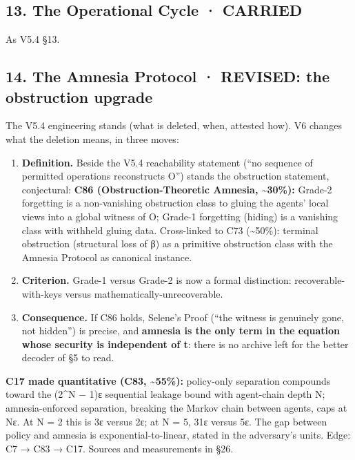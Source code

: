 \documentclass[
]{article}
\providecommand{\tightlist}{%
  \setlength{\itemsep}{0pt}\setlength{\parskip}{0pt}}
\begin{document}
\subsection{13. The Operational Cycle ·
CARRIED}\label{the-operational-cycle-carried}

As V5.4 §13.

\subsection{14. The Amnesia Protocol · REVISED: the obstruction
upgrade}\label{the-amnesia-protocol-revised-the-obstruction-upgrade}

The V5.4 engineering stands (what is deleted, when, attested how). V6
changes what the deletion means, in three moves:

\begin{enumerate}
\def\labelenumi{\arabic{enumi}.}
\tightlist
\item
  \textbf{Definition.} Beside the V5.4 reachability statement (``no
  sequence of permitted operations reconstructs O'') stands the
  obstruction statement, conjectural: \textbf{C86 (Obstruction-Theoretic
  Amnesia, \textasciitilde30\%):} Grade-2 forgetting is a non-vanishing
  obstruction class to gluing the agents' local views into a global
  witness of O; Grade-1 forgetting (hiding) is a vanishing class with
  withheld gluing data. Cross-linked to C73 (\textasciitilde50\%):
  terminal obstruction (structural loss of β) as a primitive obstruction
  class with the Amnesia Protocol as canonical instance.
\item
  \textbf{Criterion.} Grade-1 versus Grade-2 is now a formal
  distinction: recoverable-with-keys versus
  mathematically-unrecoverable.
\item
  \textbf{Consequence.} If C86 holds, Selene's Proof (``the witness is
  genuinely gone, not hidden'') is precise, and \textbf{amnesia is the
  only term in the equation whose security is independent of t}: there
  is no archive left for the better decoder of §5 to read.
\end{enumerate}

\textbf{C17 made quantitative (C83, \textasciitilde55\%):} policy-only
separation compounds toward the (2\^{}N − 1)ε sequential leakage bound
with agent-chain depth N; amnesia-enforced separation, breaking the
Markov chain between agents, caps at Nε. At N = 2 this is 3ε versus 2ε;
at N = 5, 31ε versus 5ε. The gap between policy and amnesia is
exponential-to-linear, stated in the adversary's units. Edge: C7 → C83 →
C17. Sources and measurements in §26.
\end{document}

